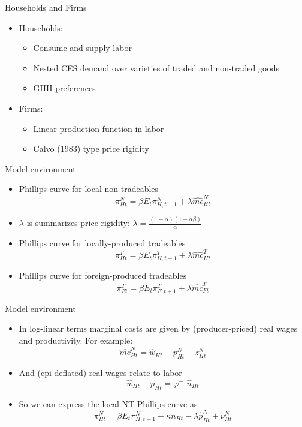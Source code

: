 \documentclass[english,xcolor=svgnames]{beamer}
\begin{document}
\begin{frame}{Households and Firms}
	\begin{itemize}
		\itemsep1em
		\item Households:
		\begin{itemize}
			\item Consume and supply labor
			\item Nested CES demand over varieties of traded and non-traded goods
			\item GHH preferences 
		\end{itemize}
		\item Firms:
		\begin{itemize}
			\item Linear production function in labor 
			\item Calvo (1983) type price rigidity
		\end{itemize}
	\end{itemize}
\end{frame}



\begin{frame}{Model environment}
\begin{itemize}
\item Phillips curve for local non-tradeables
		\[\pi^N_{Ht}=\beta E_{t}\pi^N_{H,t+1} + \lambda \hat{mc}^N_{Ht} \]
\item $\lambda$ is summarizes price rigidity: $\lambda = \frac{(1-\alpha)(1-\alpha\beta)}{\alpha}$
\item Phillips curve for locally-produced tradeables
		\[\pi^T_{Ht}=\beta E_{t}\pi^T_{H,t+1} + \lambda \hat{mc}^T_{Ht} \]
\item Phillips curve for foreign-produced tradeables
		\[\pi^T_{Ft}=\beta E_{t}\pi^T_{F,t+1} + \lambda \hat{mc}^T_{Ft} \]
		\end{itemize}
\end{frame}

\begin{frame}{Model environment}
\begin{itemize}
\item In log-linear terms marginal costs are given by (producer-priced) real wages and productivity. For example:
	\[\hat{mc}^N_{Ht} = \hat{w}_{Ht} - p^N_{Ht} - z^N_{Ht} \]
\item And (cpi-deflated) real wages relate to labor
	\[\hat{w}_{Ht} - p_{Ht} = \varphi^{-1}\hat{n}_{Ht} \]
\item So we can express the local-NT Phillips curve as
		\[\pi^N_{Ht}=\beta E_{t}\pi^N_{H,t+1} + \kappa n_{Ht}  - \lambda \hat{p}^N_{Ht} + \nu^N_{Ht} \]
\end{itemize}
\end{frame}
\end{document}
